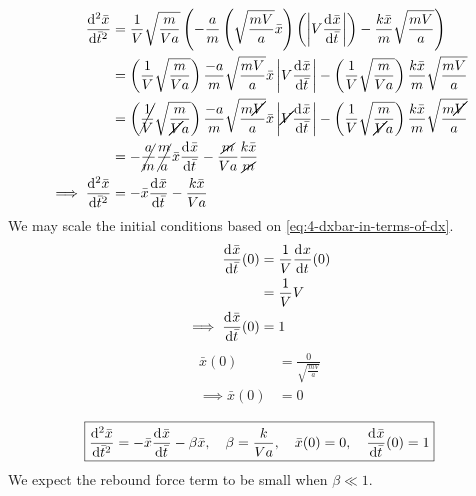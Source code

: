 \documentclass[12pt]{article}
\begin{document}
\begin{equation*}
  \begin{aligned}
    \od[2]{\bar{x}}{\bar{t}} &= \frac{1}{V}\sqrt{\frac{m}{Va}} \left(
    -\frac{a}{m}\left( \sqrt{\frac{mV}{a}}\bar{x}\right) \left(
    \abs{V\od{\bar{x}}{\bar{t}}}\right) -
    \frac{k\bar{x}}{m}\sqrt{\frac{mV}{a}}\right) \\
    &= \left(\frac{1}{V}\sqrt{\frac{m}{Va}}\right)\frac{-a}{m}\sqrt{\frac{mV}{a}}\bar{x}
    \abs{V\od{\bar{x}}{\bar{t}}} -
    \left(\frac{1}{V}\sqrt{\frac{m}{Va}}\right)\frac{k\bar{x}}{m}\sqrt{\frac{mV}{a}} \\
    &= \left(\cancel{\frac{1}{V}}\sqrt{\frac{m}{\cancel{V}a}}\right)\frac{-a}{m}\sqrt{\frac{m\cancel{V}}{a}}\bar{x}
    \abs{\cancel{V}\od{\bar{x}}{\bar{t}}} -
    \left(\frac{1}{V}\sqrt{\frac{m}{\cancel{V}a}}\right)\frac{k\bar{x}}{m}\sqrt{\frac{m\cancel{V}}{a}} \\
    &= -\cancel{\frac{a}{m}}\cancel{\frac{m}{a}}\bar{x}\od{\bar{x}}{\bar{t}} -
    \frac{\cancel{m}}{Va}\frac{k\bar{x}}{\cancel{m}} \\
    \implies \od[2]{\bar{x}}{\bar{t}} &= -\bar{x}\od{\bar{x}}{\bar{t}} - \frac{k\bar{x}}{Va} \\
  \end{aligned}
\end{equation*}
We may scale the initial conditions based on \cref{eq:4-dxbar-in-terms-of-dx}.
\begin{equation*}
  \begin{aligned}
    \od{\bar{x}}{\bar{t}}(0) &= \frac{1}{V}\od{x}{t}(0) \\
     &= \frac{1}{V}V \\
    \implies \od{\bar{x}}{\bar{t}}(0) &= 1 \\
  \end{aligned}
\end{equation*}
\begin{equation}
  \begin{aligned}
    \bar{x}(0) &= \frac{0}{\sqrt{\frac{mV}{a}}} \\
    \implies \bar{x}(0) &= 0 \\
  \end{aligned}
\end{equation}
\begin{equation*} \boxed{
    \od[2]{\bar{x}}{\bar{t}} = -\bar{x}\od{\bar{x}}{\bar{t}} - \beta\bar{x},
    \quad\beta=\frac{k}{Va},\quad \bar{x}(0)=0,
    \quad\od{\bar{x}}{\bar{t}}(0) = 1
  }
\end{equation*}
We expect the rebound force term to be small when $\beta\ll 1$.
\end{document}
